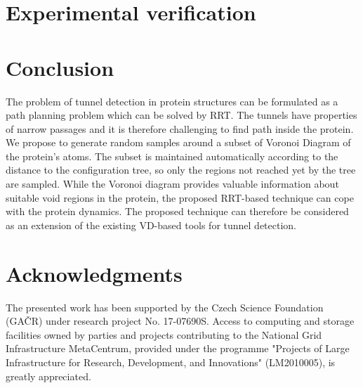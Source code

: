 \documentclass{svmult}
\begin{document}
\section{Experimental verification}



\section{Conclusion }

The problem of tunnel detection in protein structures can be formulated as a path planning problem which can be solved by RRT.
The tunnels have properties of narrow passages and it is therefore challenging to find path inside the protein.
We propose to generate random samples around a subset of Voronoi Diagram of the protein's atoms.
The subset is maintained automatically according to the distance to the configuration tree, so only the regions not reached yet
by the tree are sampled.
While the Voronoi diagram provides valuable information about suitable void regions in the protein, the
proposed RRT-based technique can cope with the protein dynamics.
The proposed technique can therefore be considered as an extension of the existing VD-based tools for tunnel detection.

\section{Acknowledgments}

The presented work has been supported by the Czech Science Foundation (GA{\v C}R) under research project No. 17-07690S.
Access to computing and storage facilities owned by parties and projects contributing to the National Grid Infrastructure MetaCentrum, provided under the programme "Projects of Large Infrastructure for Research, Development, and Innovations" (LM2010005), is greatly appreciated.




\end{document}
